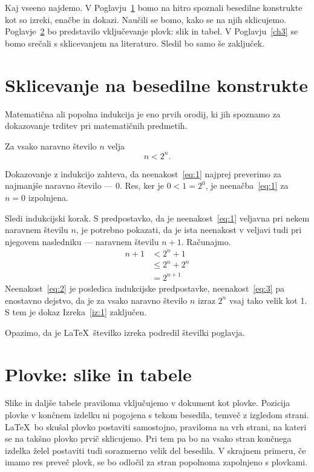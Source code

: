 Kaj vseeno najdemo. V Poglavju~\ref{ch1} bomo na hitro spoznali besedilne
konstrukte kot so izreki, enačbe in dokazi. Naučili se bomo, kako se na njih
sklicujemo. Poglavje~\ref{ch2} bo predstavilo vključevanje plovk: slik in
tabel. V Poglavju~\ref{ch3} se bomo srečali s sklicevanjem na literaturo.
Sledil bo samo še zaključek.

\chapter{Sklicevanje na besedilne konstrukte}
\label{ch1}
Matematična ali popolna indukcija je eno prvih orodij, ki jih spoznamo za dokazovanje trditev pri matematičnih predmetih.
\begin{izrek}
\label{iz:1}
Za vsako naravno število $n$ velja
\begin{equation}
n < 2^n.
\label{eq:1}
\end{equation}
\end{izrek}
\begin{dokaz}
Dokazovanje z indukcijo zahteva, da neenakost~\eqref{eq:1} najprej preverimo za najmanjše naravno število --- $0$. Res, ker je $0 < 1 = 2^0$, je neenačba~\eqref{eq:1} za $n=0$ izpolnjena.

Sledi indukcijski korak. S predpostavko, da je neenakost~\eqref{eq:1} veljavna pri nekem naravnem številu $n$, je potrebno pokazati, da je ista neenakost v veljavi tudi pri njegovem nasledniku --- naravnem številu $n+1$. Računajmo.
\begin{align}
n+1 &< 2^n + 1  \label{eq:2}\\
    &\le 2^n + 2^n \label{eq:3}\\
    &= 2^{n+1} \nonumber
\end{align}
Neenakost~\eqref{eq:2} je posledica indukcijske predpostavke, neenakost~\eqref{eq:3} pa enostavno dejstvo, da je za vsako naravno število $n$ izraz $2^n$ vsaj tako velik kot 1. S tem je dokaz Izreka~\ref{iz:1} zaključen.
\end{dokaz}

Opazimo, da je \LaTeX\ številko izreka podredil številki poglavja.


\chapter{Plovke: slike in tabele}
\label{ch2}
Slike in daljše tabele praviloma vključujemo v dokument kot plovke. Pozicija plovke v končnem izdelku ni pogojena s tekom besedila, temveč z izgledom strani. \LaTeX\ bo skušal plovko postaviti samostojno, praviloma na vrh strani, na kateri se na takšno plovko prvič sklicujemo. Pri tem pa bo na vsako stran končnega izdelka želel postaviti tudi sorazmerno velik del besedila. V skrajnem primeru, če imamo res preveč plovk, se bo odločil za stran popolnoma zapolnjeno s plovkami.

